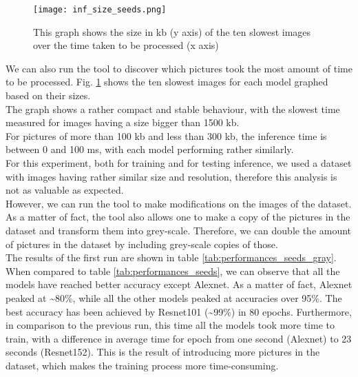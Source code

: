 \begin{figure}[h]
       \centering 
	    \texttt{[image: inf\_size\_seeds.png]}
        \caption[Size of the images over inference time for the seedlings dataset]{This graph shows the size in kb (y axis) of the ten slowest images over the time taken to be processed (x axis)}
         \label{fig:inf_size_seeds}
\end{figure}


We can also run the tool to discover which pictures took the most amount of time to be processed. Fig. \ref{fig:inf_size_seeds} shows the ten slowest images for each model graphed based on their sizes. \\
The graph shows a rather compact and stable behaviour, with the slowest time measured for images having a size bigger than 1500 kb. \\
For pictures of more than 100 kb and less than 300 kb, the inference time is between 0 and 100 ms, with each model performing rather similarly. \\
For this experiment, both for training and for testing inference, we used a dataset with images having rather similar size and resolution, therefore this analysis is not as valuable as expected.\\
However, we can run the tool to make modifications on the images of the dataset. As a matter of fact, the tool also allows one to make a copy of the pictures in the dataset and transform them into grey-scale. Therefore, we can double the amount of pictures in the dataset by including grey-scale copies of those. \\
The results of the first run are shown in table \ref{tab:performances_seeds_gray}. When compared to 
table \ref{tab:performances_seeds}, we can observe that all the models have reached better accuracy except Alexnet. As a matter of fact, Alexnet peaked at \textasciitilde80\%, while all the other models peaked at accuracies over 95\%. The best accuracy has been achieved by Resnet101 (\textasciitilde99\%) in 80 epochs. Furthermore, in comparison to the previous run, this time all the models took more time to train, with a difference in average time for epoch from one second (Alexnet) to 23 seconds (Resnet152). This is the result of introducing more pictures in the dataset, which makes the training process more time-consuming. \\
